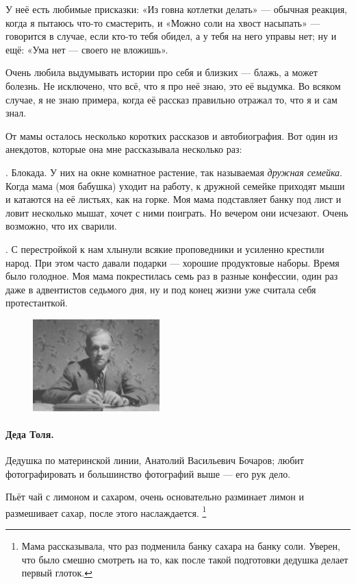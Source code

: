 \documentclass{book}
\begin{document}
У неё есть любимые присказки: «Из говна котлетки делать» --- обычная реакция, когда я пытаюсь что-то смастерить, и «Можно соли на хвост насыпать» --- говорится в случае, если кто-то тебя обидел, а у тебя на него управы нет;
ну и ещё: «Ума нет --- своего не вложишь».

Очень любила выдумывать истории про себя и близких --- блажь, а может болезнь.
Не исключено, что всё, что я про неё знаю, это её выдумка.
Во всяком случае, я не знаю примера, когда её рассказ правильно отражал то, что я и сам знал.

От мамы осталось несколько коротких рассказов и автобиография.
Вот один из анекдотов, которые она мне рассказывала несколько раз:

.
Блокада. 
У них на окне комнатное растение, так называемая \textit{дружная семейка}.
Когда мама (моя бабушка) уходит на работу, к дружной семейке приходят мыши и катаются на её листьях, как на горке.
Моя мама подставляет банку под лист и ловит несколько мышат, хочет с ними поиграть.
Но вечером они исчезают.
Очень возможно, что их сварили.

.
С перестройкой к нам хлынули всякие проповедники и усиленно крестили народ.
При этом часто давали подарки --- хорошие продуктовые наборы.
Время было голодное.
Моя мама покрестилась семь раз в разные конфессии, один раз даже в адвентистов седьмого дня,
ну и под конец жизни уже считала себя протестанткой.

\begin{figure}
\vskip-4mm
\centering
\includegraphics[width=49mm,angle=0]{pics/deda-tolya}
\end{figure}

\paragraph{Деда Толя.}
Дедушка по материнской линии,
Анатолий Васильевич Бочаров; любит фотографировать и большинство фотографий выше --- его рук дело.

Пьёт чай с лимоном и сахаром, очень основательно разминает лимон и размешивает сахар, после этого наслаждается.%
\footnote{Мама рассказывала, что раз подменила банку сахара на банку соли.
Уверен, что было смешно смотреть на то, как после такой подготовки дедушка делает первый глоток.}
\end{document}
